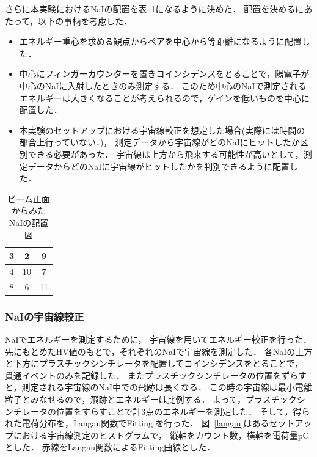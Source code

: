 さらに本実験におけるNaIの配置を表~\ref{haichi}になるように決めた．
配置を決めるにあたって，以下の事柄を考慮した．
\begin{itemize}
\item エネルギー重心を求める観点からペアを中心から等距離になるように配置した．
\item 中心にフィンガーカウンターを置きコインシデンスをとることで，陽電子が中心のNaIに入射したときのみ測定する．
  このため中心のNaIで測定されるエネルギーは大きくなることが考えられるので，ゲインを低いものを中心に配置した．
\item 本実験のセットアップにおける宇宙線較正を想定した場合(実際には時間の都合上行っていない．)，
  測定データから宇宙線がどのNaIにヒットしたか区別できる必要があった．
  宇宙線は上方から飛来する可能性が高いとして，測定データからどのNaIに宇宙線がヒットしたかを判別できるように配置した．
\end{itemize}
\begin{table}[H]
  \begin{center}
    \caption{ビーム正面からみたNaIの配置図}\label{haichi}
    \begin{tabular}{|c|c|c|}\hline 
      \cellcolor{yellow}3&\cellcolor{red}2&\cellcolor{yellow}9\\ \hline
      \cellcolor{cyan}4&10&\cellcolor{red}7\\ \hline
      \cellcolor{green}8&\cellcolor{cyan}6&\cellcolor{green}11\\ \hline
    \end{tabular}
  \end{center}
\end{table}
\newpage
\subsubsection{NaIの宇宙線較正}
NaIでエネルギーを測定するために， 宇宙線を用いてエネルギー較正を行った．
先にもとめたHV値のもとで，それぞれのNaIで宇宙線を測定した．
各NaIの上方と下方にプラスチックシンチレータを配置してコインシデンスをとることで，
貫通イベントのみを記録した．
またプラスチックシンチレータの位置をずらすと，測定される宇宙線のNaI中での飛跡は長くなる．
この時の宇宙線は最小電離粒子とみなせるので，飛跡とエネルギーは比例する．
よって，プラスチックシンチレータの位置をすらすことで計3点のエネルギーを測定した．
そして，得られた電荷分布を，Langau関数でFitting を行った．
図~\ref{langau}はあるセットアップにおける宇宙線測定のヒストグラムで，
縦軸をカウント数，横軸を電荷量$\mathrm{pC}$とした．
赤線をLangau関数によるFitting曲線とした．

